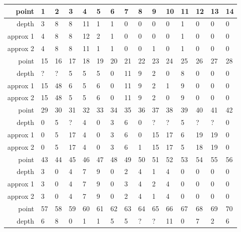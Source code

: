 \begin{center}
  \tablefirsthead{\hline}
  \tablelasttail{\hline}
  \begin{supertabular}{|r|l l l l l l l l l l l l l l|}
\hline
point & 1 & 2 & 3 & 4 & 5 & 6 & 7 & 8 & 9 & 10 & 11 & 12 & 13 & 14 \\
\hline
depth & 3 & 8 & 8 & 11 & 1 & 1 & 0 & 0 & 0 & 0 & 1 & 0 & 0 & 0 \\
approx 1 & 4 & 8 & 8 & 12 & 2 & 1 & 0 & 0 & 0 & 0 & 1 & 0 & 0 & 0 \\
approx 2 & 4 & 8 & 8 & 11 & 1 & 1 & 0 & 0 & 1 & 0 & 1 & 0 & 0 & 0 \\
\hline
point & 15 & 16 & 17 & 18 & 19 & 20 & 21 & 22 & 23 & 24 & 25 & 26 & 27 & 28 \\
\hline
depth & ? & ? & 5 & 5 & 5 & 0 & 11 & 9 & 2 & 0 & 8 & 0 & 0 & 0 \\
approx 1 & 15 & 48 & 6 & 5 & 6 & 0 & 11 & 9 & 2 & 1 & 9 & 0 & 0 & 0 \\
approx 2 & 15 & 48 & 5 & 5 & 6 & 0 & 11 & 9 & 2 & 0 & 9 & 0 & 0 & 0 \\
\hline
point & 29 & 30 & 31 & 32 & 33 & 34 & 35 & 36 & 37 & 38 & 39 & 40 & 41 & 42 \\
\hline
depth & 0 & 5 & ? & 4 & 0 & 3 & 6 & 0 & ? & ? & 5 & ? & ? & 0 \\
approx 1 & 0 & 5 & 17 & 4 & 0 & 3 & 6 & 0 & 15 & 17 & 6 & 19 & 19 & 0 \\
approx 2 & 0 & 5 & 17 & 4 & 0 & 3 & 6 & 1 & 15 & 17 & 5 & 18 & 19 & 0 \\
\hline
point & 43 & 44 & 45 & 46 & 47 & 48 & 49 & 50 & 51 & 52 & 53 & 54 & 55 & 56 \\
\hline
depth & 3 & 0 & 4 & 7 & 9 & 0 & 2 & 4 & 1 & 4 & 0 & 0 & 0 & 0 \\
approx 1 & 3 & 0 & 4 & 7 & 9 & 0 & 3 & 4 & 2 & 4 & 0 & 0 & 0 & 0 \\
approx 2 & 3 & 0 & 4 & 7 & 9 & 0 & 2 & 4 & 1 & 4 & 0 & 0 & 0 & 0 \\
\hline
point & 57 & 58 & 59 & 60 & 61 & 62 & 63 & 64 & 65 & 66 & 67 & 68 & 69 & 70 \\
\hline
depth & 6 & 8 & 0 & 1 & 1 & 5 & 5 & ? & ? & 11 & 0 & 7 & 2 & 6 \\

\end{supertabular}
\end{center}
